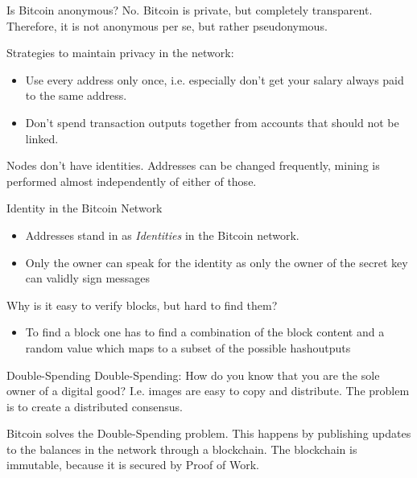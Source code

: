 \documentclass[12pt, usepdftitle=false]{beamer}
\begin{document}

\begin{frame}{Is Bitcoin anonymous?}
No. Bitcoin is private, but completely transparent. Therefore, it is not anonymous per se, but rather pseudonymous.

Strategies to maintain privacy in the network:
\begin{itemize}
	\item Use every address only once, i.e. especially don't get your salary always paid to the same address.
	\item Don't spend transaction outputs together from accounts that should not be linked.
\end{itemize}

Nodes don't have identities. Addresses can be changed frequently, mining is performed almost independently of either of those.
\end{frame}


\begin{frame}{Identity in the Bitcoin Network}
\begin{itemize}
	\item Addresses stand in as \emph{Identities} in the Bitcoin network.
	\item Only the owner can speak for the identity as only the owner of the secret key can validly sign messages
\end{itemize}
\end{frame}


\begin{frame}{Why is it easy to verify blocks, but hard to find them?}
\begin{itemize}
	\item To find a block one has to find a combination of the block content and a random value which maps to a subset of the possible hashoutputs
\end{itemize}
\end{frame}


\begin{frame}{Double-Spending}
	Double-Spending: How do you know that you are the sole owner of a digital good? I.e. images are easy to copy and distribute. The problem is to create a distributed consensus.

	Bitcoin solves the Double-Spending problem. This happens by publishing updates to the balances in the network through a blockchain. The blockchain is immutable, because it is secured by Proof of Work.
\end{frame}
\end{document}
